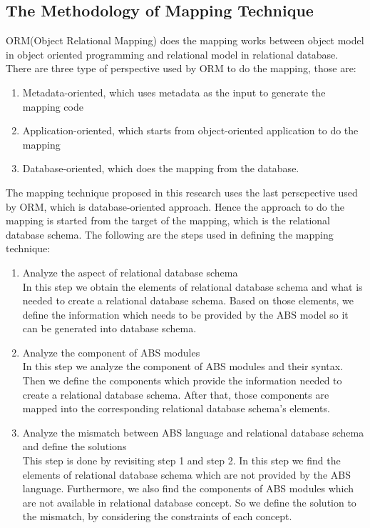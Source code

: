 \documentclass[runningheads,a4paper]{llncs}
\begin{document}
\subsection{The Methodology of Mapping Technique}
ORM(Object Relational Mapping) does the mapping works between object model in object oriented programming and relational model in relational database. There are three type of perspective used by ORM to do the mapping, those are:
\begin{enumerate}
	\item Metadata-oriented, which uses metadata as the input to generate the mapping code
	\item Application-oriented, which starts from object-oriented application to do the mapping
	\item Database-oriented, which does the mapping from the database.
\end{enumerate}

The mapping technique proposed in this research uses the last perscpective used by ORM, which is database-oriented approach. Hence the approach to do the mapping is started from the target of the mapping, which is the relational database schema. The following are the steps used in defining the mapping technique:

\begin{enumerate}
	\item Analyze the aspect of relational database schema\\
	In this step we obtain the elements of relational database schema and what is needed to create a relational database schema. Based on those elements, we define the information which needs to be provided by the ABS model so it can be generated into database schema.
	\item Analyze the component of ABS modules\\
	In this step we analyze the component of ABS modules and their syntax. Then we define the components which provide the information needed to create a relational database schema. After that, those components are mapped into the corresponding relational database schema’s elements.
	\item Analyze the mismatch between ABS language and relational database schema and define the solutions\\
	This step is done by revisiting step 1 and step 2. In this step we find the elements of relational database schema which are not provided by the ABS language. Furthermore, we also find the components of ABS modules which are not available in relational database concept. So we define the solution to the mismatch, by considering the constraints of each concept.
\end{enumerate}
\end{document}

